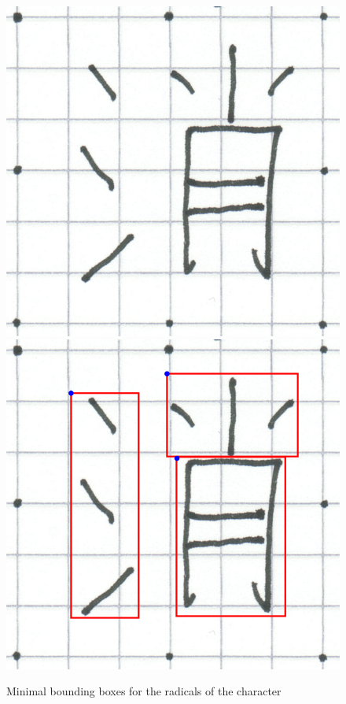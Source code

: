 \begin{figure}[htbp]
  \begin{center}
    \includegraphics[scale=0.2]{images/characterMinimalBoxes1.png}
    \includegraphics[scale=0.2]{images/characterMinimalBoxes2.png}
    \caption{Minimal bounding boxes for the radicals of the character~}
    \label{fig:boxing}
  \end{center}
\end{figure}

